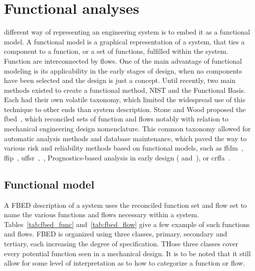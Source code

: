 %
%
\let\textcircled=\pgftextcircled
\chapter{Functional analyses}
\label{chap:fm}


 different way of representing an engineering system is to embed it as a functional model. A functional model is a graphical representation of a system, that ties a component to a function, or a set of functions, fulfilled within the system. Function are interconnected by flows. One of the main advantage of functional modeling is its applicability in the early stages of design, when no components have been selected and the design is just a concept. Until recently, two main methods existed to create a functional method, NIST and the Functional Basis. Each had their own volatile taxonomy, which limited the widespread use of this technique to other ends than system description. Stone and Wood proposed the \gls{fbed}~\cite{stone}, which reconciled sets of function and flows notably with relation to mechanical engineering design nomenclature. This common taxonomy allowed for automatic analysis methods and database maintenance, which paved the way to various risk and reliability methods based on functional models, such as \gls{ffdm}~\cite{stone2005}, \gls{ffip}~\cite{kurtoglu2007}, \gls{uffsr}~\cite{vanbossuyt2014},~\cite{ohalloran2015}, Prognostics-based analysis in early design (\cite{stack2015} and~\cite{lher2016}), or \gls{crffa}~\cite{ohalloran2016}.


\section{Functional model}

A FBED description of a system uses the reconciled function set and flow set to name the various functions and flows necessary within a system. Tables~\ref{tab:fbed_func} and~\ref{tab:fbed_flow} give a few example of such functions and flows. FBED is organized using three classes, primary, secondary and tertiary, each increasing the degree of specification. THose three classes cover every potential function seen in a mechanical design. It is to be noted that it still allow for some level of interpretation as to how to categorize a function or flow.

